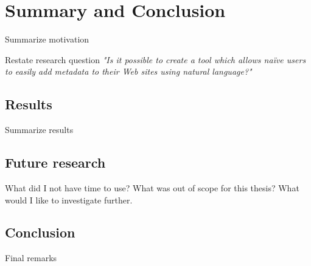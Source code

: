 \chapter{Summary and Conclusion} %
\label{Conclusion} %
Summarize motivation

Restate research question
\emph{"Is it possible to create a tool which allows naïve users to easily add metadata to their Web sites using natural language?"}

\section{Results}
Summarize results

\section{Future research}
What did I not have time to use? What was out of scope for this thesis? What would I like to investigate further.

\section{Conclusion}
Final remarks